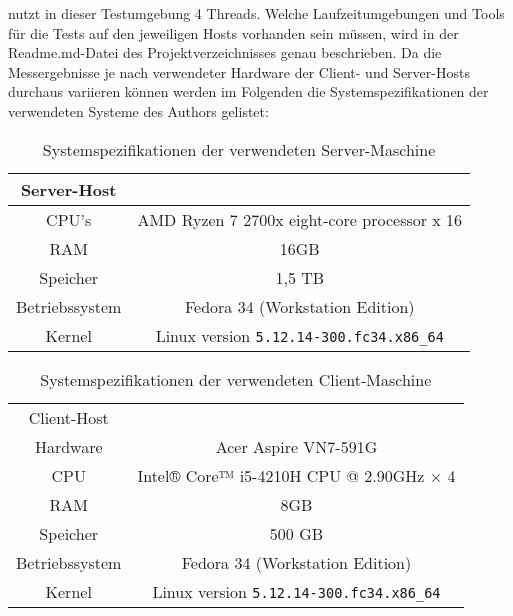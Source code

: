 nutzt in dieser Testumgebung 4 Threads.
Welche Laufzeitumgebungen und Tools für die Tests auf den jeweiligen Hosts vorhanden sein müssen,
wird in der Readme.md-Datei des Projektverzeichnisses genau beschrieben.
Da die Messergebnisse je nach verwendeter Hardware der Client- und Server-Hosts durchaus variieren können werden im Folgenden
die Systemspezifikationen der verwendeten Systeme des Authors gelistet:
\begin{table}[ht!]
	\centering
	\begin{tabular}{| c | c |}
		\hline
		Server-Host                                                  \\
		\hline
		CPU's          & AMD Ryzen 7 2700x eight-core processor x 16 \\
		\hline
		RAM            & 16GB                                        \\
		\hline
		Speicher       & 1,5 TB                                      \\
		\hline
		Betriebssystem & Fedora 34 (Workstation Edition)             \\
		\hline
		Kernel         & Linux version \verb|5.12.14-300.fc34.x86_64|    \\
		\hline
	\end{tabular}
	\caption{Systemspezifikationen der verwendeten Server-Maschine}
	\label{table:system_host}
\end{table}

\begin{table}[ht!]
	\centering
	\begin{tabular}{| c | c |}
		\hline
		Client-Host                                               \\
		Hardware       & Acer Aspire VN7-591G                     \\
		\hline
		CPU            & Intel® Core™ i5-4210H CPU @ 2.90GHz × 4  \\
		\hline
		RAM            & 8GB                                      \\
		\hline
		Speicher       & 500 GB                                   \\
		\hline
		Betriebssystem & Fedora 34 (Workstation Edition)          \\
		\hline
		Kernel         & Linux version \verb|5.12.14-300.fc34.x86_64| \\
		\hline
	\end{tabular}
	\caption{Systemspezifikationen der verwendeten Client-Maschine}
	\label{table:system_client}
\end{table}

